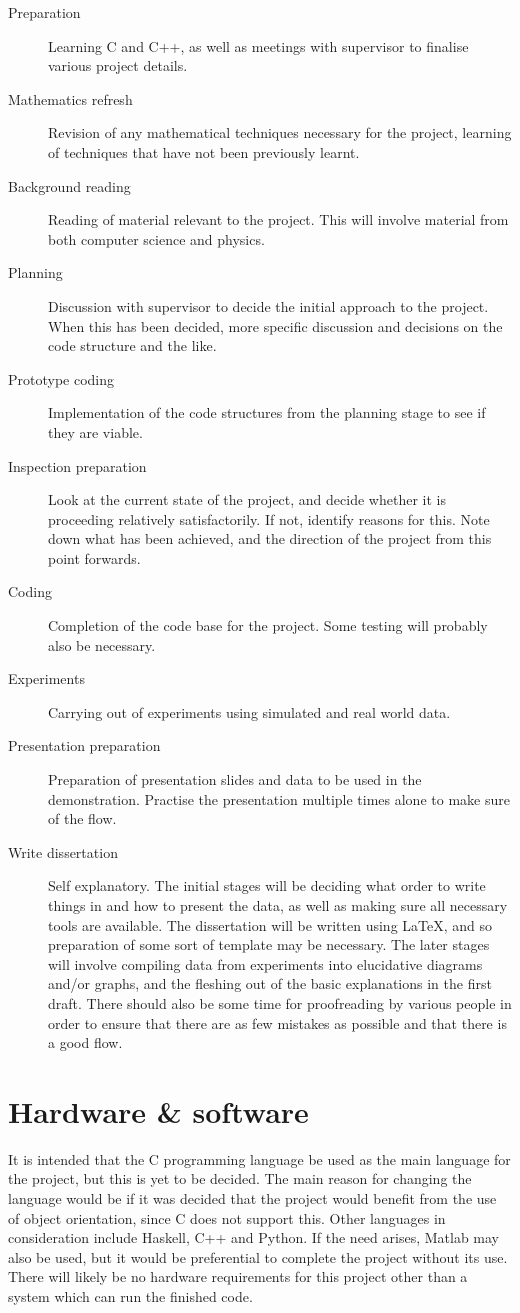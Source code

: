 \documentclass[10pt,a4paper]{article}
\begin{document}
\begin{description}
\item[Preparation] Learning C and C++, as well as meetings with supervisor to finalise various project details.
\item[Mathematics refresh] Revision of any mathematical techniques necessary for the project, learning of techniques that have not been previously learnt.
\item[Background reading] Reading of material relevant to the project. This will involve material from both computer science and physics.
\item[Planning] Discussion with supervisor to decide the initial approach to the project. When this has been decided, more specific discussion and decisions on the code structure and the like.
\item[Prototype coding] Implementation of the code structures from the planning stage to see if they are viable.
\item[Inspection preparation] Look at the current state of the project, and decide whether it is proceeding relatively satisfactorily. If not, identify reasons for this. Note down what has been achieved, and the direction of the project from this point forwards.
\item[Coding] Completion of the code base for the project. Some testing will probably also be necessary.
\item[Experiments] Carrying out of experiments using simulated and real world data.
\item[Presentation preparation] Preparation of presentation slides and data to be used in the demonstration. Practise the presentation multiple times alone to make sure of the flow.
\item[Write dissertation] Self explanatory. The initial stages will be deciding what order to write things in and how to present the data, as well as making sure all necessary tools are available. The dissertation will be written using \LaTeX, and so preparation of some sort of template may be necessary. The later stages will involve compiling data from experiments into elucidative diagrams and/or graphs, and the fleshing out of the basic explanations in the first draft. There should also be some time for proofreading by various people in order to ensure that there are as few mistakes as possible and that there is a good flow.
\end{description}

\section*{Hardware \& software}

It is intended that the C programming language be used as the main language for the project, but this is yet to be decided. The main reason for changing the language would be if it was decided that the project would benefit from the use of object orientation, since C does not support this. Other languages in consideration include Haskell, C++ and Python. If the need arises, Matlab may also be used, but it would be preferential to complete the project without its use. There will likely be no hardware requirements for this project other than a system which can run the finished code. 
\end{document}

